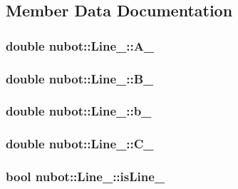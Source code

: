 \subsection{Member Data Documentation}
\hypertarget{classnubot_1_1Line___a78d6e6771b3542aeac3092b28c6f8477}{
\subsubsection[{A\-\_\-}]{\setlength{\rightskip}{0pt plus 5cm}double nubot\-::\-Line\-\_\-\-::\-A\-\_\-}}\label{classnubot_1_1Line___a78d6e6771b3542aeac3092b28c6f8477}
\hypertarget{classnubot_1_1Line___a6ec007dca1b1a5ae1132290dea230545}{
\subsubsection[{B\-\_\-}]{\setlength{\rightskip}{0pt plus 5cm}double nubot\-::\-Line\-\_\-\-::\-B\-\_\-}}\label{classnubot_1_1Line___a6ec007dca1b1a5ae1132290dea230545}
\hypertarget{classnubot_1_1Line___a57c955f64b7b2ecf2858f589c1880a45}{
\subsubsection[{b\-\_\-}]{\setlength{\rightskip}{0pt plus 5cm}double nubot\-::\-Line\-\_\-\-::b\-\_\-}}\label{classnubot_1_1Line___a57c955f64b7b2ecf2858f589c1880a45}
\hypertarget{classnubot_1_1Line___a2949bf29de27c89c653afb5ca77c30d3}{
\subsubsection[{C\-\_\-}]{\setlength{\rightskip}{0pt plus 5cm}double nubot\-::\-Line\-\_\-\-::\-C\-\_\-}}\label{classnubot_1_1Line___a2949bf29de27c89c653afb5ca77c30d3}
\hypertarget{classnubot_1_1Line___accfccb14bb889d1579c653aed927fb82}{
\subsubsection[{is\-Line\-\_\-}]{\setlength{\rightskip}{0pt plus 5cm}bool nubot\-::\-Line\-\_\-\-::is\-Line\-\_\-}}\label{classnubot_1_1Line___accfccb14bb889d1579c653aed927fb82}
